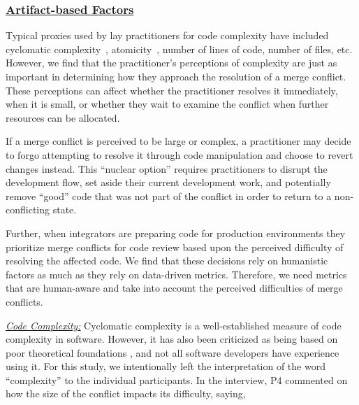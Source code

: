 \subsubsection{\underline{Artifact-based Factors}}
Typical proxies used by lay practitioners for code complexity have included cyclomatic complexity~\cite{fenton2000quantitative}, atomicity~\cite{khelladi2016ad}, number of lines of code, number of files, etc.
However, we find that the practitioner's perceptions of complexity are just as important in determining how they approach the resolution of a merge conflict.
These perceptions can affect whether the practitioner resolves it immediately, when it is small, or whether they wait to examine the conflict when further resources can be allocated.

If a merge conflict is perceived to be large or complex, a practitioner may decide to forgo attempting to resolve it through code manipulation and choose to revert changes instead.
This ``nuclear option'' requires practitioners to disrupt the development flow, set aside their current development work, and potentially remove ``good'' code that was not part of the conflict in order to return to a non-conflicting state.

Further, when integrators are preparing code for production environments they prioritize merge conflicts for code review based upon the perceived difficulty of resolving the affected code.
We find that these decisions rely on humanistic factors as much as they rely on data-driven metrics.
Therefore, we need metrics that are human-aware and take into account the perceived difficulties of merge conflicts.


\underline{\textit{Code Complexity:}} Cyclomatic complexity \cite{mccabe1976complexity} is a well-established measure of code complexity in software. However, it has also been criticized as being based on poor theoretical foundations \cite{Shepperd1988}, and not all software developers have experience using it. For this study, we intentionally left the interpretation of the word ``complexity'' to the individual participants.
In the interview, P4 commented on how the size of the conflict impacts its difficulty, saying,


